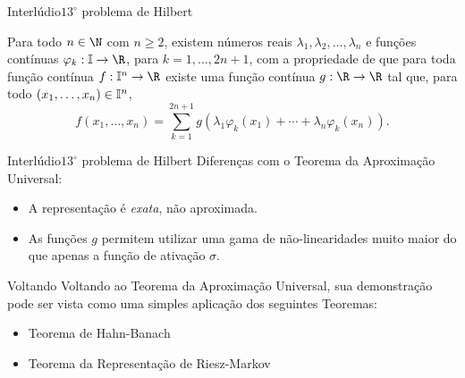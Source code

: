 \documentclass[13pt]{beamer}
\begin{document}
\begin{frame}{Interlúdio}{\( 13^{ \circ } \) problema de Hilbert}
    \begin{teo*}
        Para todo \( n \in \N \) com \( n \geq 2 \), existem números reais \( \lambda_{ 1 }, \lambda_{ 2 }, \dots, \lambda_{ n } \) e funções contínuas \( \varphi_{ k } : \I \to \R \), para \( k = 1, \dots, 2n+1 \), com a propriedade de que para toda função contínua \( f : \I^{ n } \to \R \) existe uma função contínua \( g : \R \to \R \) tal que, para todo \( ( x_{ 1 }, \dots, x_{ n } ) \in \mathbb{I}^{ n } \),
        \begin{equation*}
            f ( x_{ 1 }, \dots, x_{ n } ) = \sum_{ k=1 }^{ 2n+1 } g ( \lambda_{ 1 } \varphi_{ k } ( x_{ 1 } ) + \cdots + \lambda_{ n } \varphi_{ k } ( x_{ n } ) )
        .\end{equation*}
    \end{teo*}
\end{frame}

\begin{frame}{Interlúdio}{\( 13^{ \circ } \) problema de Hilbert}
    \vspace{2pt}
    Diferenças com o Teorema da Aproximação Universal:
    \begin{itemize}
        \item<1-> A representação é \emph{exata}, não aproximada.
        \item<2-> As funções \( g \) permitem utilizar uma gama de não-linearidades muito maior do que apenas a função de ativação \( \sigma \).
    \end{itemize}
\end{frame}



\begin{frame}{Voltando}
    Voltando ao Teorema da Aproximação Universal, sua demonstração pode ser vista como uma simples aplicação dos seguintes Teoremas:
    \begin{itemize}
        \item<2-> Teorema de Hahn-Banach
        \item<3-> Teorema da Representação de Riesz-Markov
    \end{itemize}
\end{frame}
\end{document}
